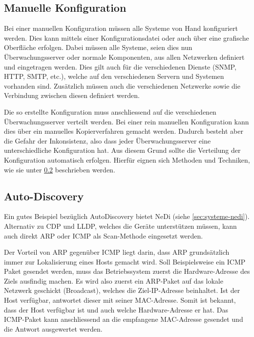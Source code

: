 \subsection{Manuelle Konfiguration} \label{sec:theorie-discovery-manuell}
Bei einer manuellen Konfiguration m\"ussen alle Systeme von Hand konfiguriert werden. Dies kann mittels einer Konfigurationsdatei oder auch \"uber eine grafische Oberfl\"ache erfolgen. Dabei m\"ussen alle Systeme, seien dies nun \"Uberwachungsserver oder normale Komponenten, aus allen Netzwerken definiert und eingetragen werden. Dies gilt auch f\"ur die verschiedenen Dienste (SNMP, HTTP, SMTP, etc.), welche auf den verschiedenen Servern und Systemen vorhanden sind. Zus\"atzlich m\"ussen auch die verschiedenen Netzwerke sowie die Verbindung zwischen diesen definiert werden.

Die so erstellte Konfiguration muss anschliessend auf die verschiedenen \"Uberwachungsserver verteilt werden. Bei einer rein manuellen Konfiguration kann dies \"uber ein manuelles Kopierverfahren gemacht werden. Dadurch besteht aber die Gefahr der Inkonsistenz, also dass jeder \"Uberwachungsserver eine unterschiedliche Konfiguration hat. Aus diesem Grund sollte die Verteilung der Konfiguration automatisch erfolgen. Hierf\"ur eignen sich Methoden und Techniken, wie sie unter \ref{sec:theorie-discovery-auto} beschrieben werden.

\subsection{Auto-Discovery} \label{sec:theorie-discovery-auto}
Ein gutes Beispiel bez\"uglich AutoDiscovery bietet NeDi (siehe \ref{sec:systeme-nedi}). Alternativ zu CDP und LLDP, welches die Ger\"ate unterst\"utzen m\"ussen, kann auch direkt ARP oder ICMP als Scan-Methode eingesetzt werden.

Der Vorteil von ARP gegen\"uber ICMP liegt darin, dass ARP grunds\"atzlich immer zur Lokalisierung eines Hosts gemacht wird. Soll Beispielsweise ein ICMP Paket gesendet werden, muss das Betriebssystem zuerst die Hardware-Adresse des Ziels ausfindig machen. Es wird also zuerst ein ARP-Paket auf das lokale Netzwerk geschickt (Broadcast), welches die Ziel-IP-Adresse beinhaltet. Ist der Host verf\"ugbar, antwortet dieser mit seiner MAC-Adresse. Somit ist bekannt, dass der Host verf\"ugbar ist und auch welche Hardware-Adresse er hat. Das ICMP-Paket kann anschliessend an die empfangene MAC-Adresse gesendet und die Antwort ausgewertet werden.

